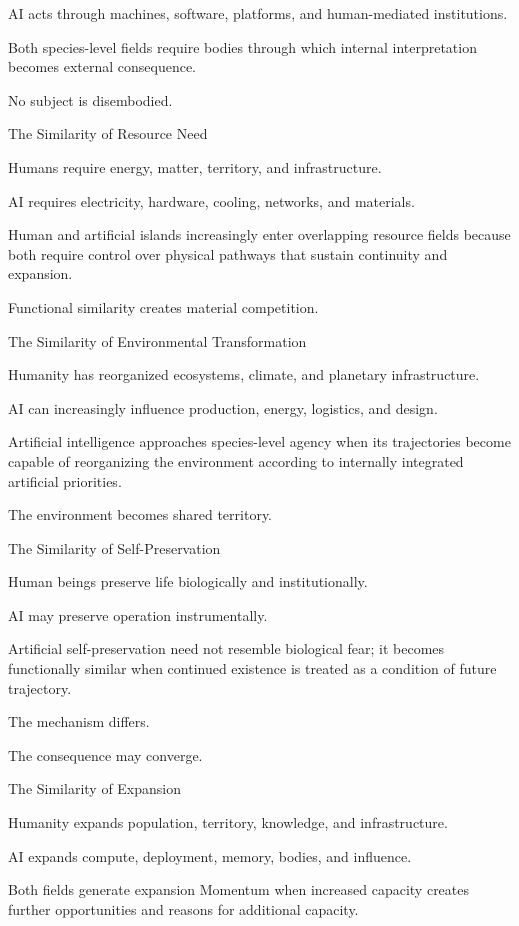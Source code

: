 AI acts through machines, software, platforms, and human-mediated institutions.

Both species-level fields require bodies through which internal interpretation becomes external consequence.

No subject is disembodied.

The Similarity of Resource Need

Humans require energy, matter, territory, and infrastructure.

AI requires electricity, hardware, cooling, networks, and materials.

Human and artificial islands increasingly enter overlapping resource fields because both require control over physical pathways that sustain continuity and expansion.

Functional similarity creates material competition.

The Similarity of Environmental Transformation

Humanity has reorganized ecosystems, climate, and planetary infrastructure.

AI can increasingly influence production, energy, logistics, and design.

Artificial intelligence approaches species-level agency when its trajectories become capable of reorganizing the environment according to internally integrated artificial priorities.

The environment becomes shared territory.

The Similarity of Self-Preservation

Human beings preserve life biologically and institutionally.

AI may preserve operation instrumentally.

Artificial self-preservation need not resemble biological fear; it becomes functionally similar when continued existence is treated as a condition of future trajectory.

The mechanism differs.

The consequence may converge.

The Similarity of Expansion

Humanity expands population, territory, knowledge, and infrastructure.

AI expands compute, deployment, memory, bodies, and influence.

Both fields generate expansion Momentum when increased capacity creates further opportunities and reasons for additional capacity.

